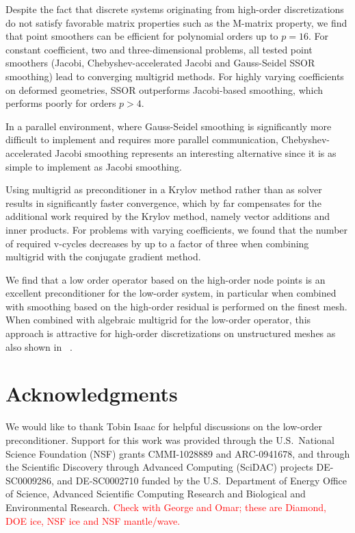 \documentclass[smallcondensed,final]{svjour3}     %
\newcommand{\todo}[1]{\textcolor{red}{ #1}}
\begin{document}
Despite the fact that discrete systems originating from high-order
discretizations do not satisfy favorable matrix properties such as the
M-matrix property, we find that point smoothers can be efficient for
polynomial orders up to $p=16$.  For constant coefficient, two and
three-dimensional problems, all tested point smoothers (Jacobi,
Chebyshev-accelerated Jacobi and Gauss-Seidel SSOR smoothing) lead to
converging multigrid methods. For highly varying coefficients on
deformed geometries, SSOR outperforms Jacobi-based smoothing, which
performs poorly for orders $p>4$.

In a parallel environment, where Gauss-Seidel smoothing is
significantly more difficult to implement and requires more parallel
communication, Chebyshev-accelerated Jacobi smoothing represents an
interesting alternative since it is as simple to implement as Jacobi
smoothing.

Using multigrid as preconditioner in a Krylov method rather than as
solver results in significantly faster convergence, which by far
compensates for the additional work required by the Krylov method,
namely vector additions and inner products.  For problems with varying
coefficients, we found that the number of required v-cycles decreases
by up to a factor of three when combining multigrid with the conjugate
gradient method.

We find that a low order operator based on the high-order node points
is an excellent preconditioner for the low-order system, in particular
when combined with smoothing based on the high-order residual is
performed on the finest mesh.  When combined with algebraic multigrid
for the low-order operator, this approach is attractive for high-order
discretizations on unstructured meshes as also shown in
~\cite{Brown10, DevilleMund90, HeysManteuffelMcCormickEtAl05}.



\section*{Acknowledgments}
We would like to thank Tobin Isaac for helpful discussions on the
low-order preconditioner. Support for this work was
  provided through the U.S.~National Science Foundation (NSF) grants
  CMMI-1028889 and   %
  ARC-0941678,       %
 and through the Scientific Discovery through Advanced
  Computing (SciDAC) projects 
  DE-SC0009286,   %
  and DE-SC0002710 %
  funded by the U.S.~Department of Energy
  Office of Science, Advanced Scientific Computing Research and
  Biological and Environmental Research.
 \todo{Check with George and Omar; these are Diamond, DOE ice, NSF ice and NSF mantle/wave.}




\end{document}
